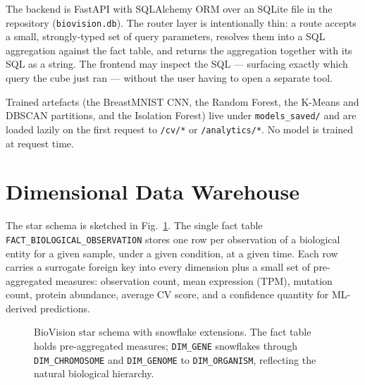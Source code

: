 \documentclass[conference,10pt]{IEEEtran}
\begin{document}
The backend is FastAPI \cite{fastapi2024} with SQLAlchemy ORM
\cite{sqlalchemy2024} over an SQLite file in the repository
(\texttt{biovision.db}). The router layer is intentionally thin: a route
accepts a small, strongly-typed set of query parameters, resolves them
into a SQL aggregation against the fact table, and returns the
aggregation together with its SQL as a string. The frontend may
inspect the SQL --- surfacing exactly which query the cube just ran ---
without the user having to open a separate tool.

Trained artefacts (the BreastMNIST CNN, the Random Forest, the K-Means
and DBSCAN partitions, and the Isolation Forest) live under
\texttt{models\_saved/} and are loaded lazily on the first request to
\texttt{/cv/*} or \texttt{/analytics/*}. No model is trained at request
time.

\section{Dimensional Data Warehouse}
The star schema is sketched in Fig.~\ref{fig:schema}. The single fact
table \texttt{FACT\_BIOLOGICAL\_OBSERVATION} stores one row per
observation of a biological entity for a given sample, under a given
condition, at a given time. Each row carries a surrogate foreign key
into every dimension plus a small set of pre-aggregated measures:
observation count, mean expression (TPM), mutation count, protein
abundance, average CV score, and a confidence quantity for ML-derived
predictions.

\begin{figure}[t]
\centering
{}
\caption{BioVision star schema with snowflake extensions. The fact table
holds pre-aggregated measures; \texttt{DIM\_GENE} snowflakes through
\texttt{DIM\_CHROMOSOME} and \texttt{DIM\_GENOME} to \texttt{DIM\_ORGANISM},
reflecting the natural biological hierarchy.}
\label{fig:schema}
\end{figure}
\end{document}
